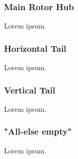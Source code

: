 \subsubsection{Main Rotor Hub}

Lorem ipsum.

\subsubsection{Horizontal Tail}

Lorem ipsum.

\subsubsection{Vertical Tail}

Lorem ipsum.

\subsubsection{"All-else empty"}

Lorem ipsum.
